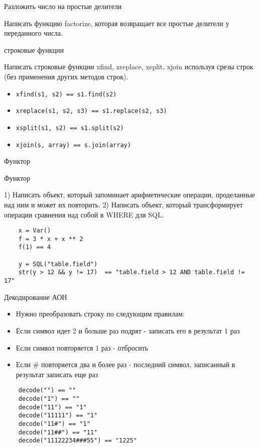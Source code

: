 \documentclass{article}
\begin{document}
\begin{center} Разложить число на простые делители \end{center}
Написать функцию factorize, которая возвращает все простые делители
у переданного числа.
\newpage

\begin{center} строковые функции \end{center}
Написать строковые функции xfind, xreplace, xsplit, xjoin используя
срезы строк (без применения других методов строк).
\begin{itemize}
    \item \lstinline!xfind(s1, s2) == s1.find(s2)!
    \item \lstinline!xreplace(s1, s2, s3) == s1.replace(s2, s3)!
    \item \lstinline!xsplit(s1, s2) == s1.split(s2)!
    \item \lstinline!xjoin(s, array) == s.join(array)!
\end{itemize}
\newpage

\begin{center} Функтор \end{center}

\begin{center} Функтор \end{center}
1) Написать объект, который запоминает арифметические операции, проделанные над ним 
и может их повторить.
2) Написать объект, который трансформирует операции сравнения над собой в WHERE для SQL.

\begin{lstlisting}
    x = Var()
    f = 3 * x + x ** 2
    f(1) == 4

    y = SQL("table.field")
    str(y > 12 && y != 17)  == "table.field > 12 AND table.field != 17"
\end{lstlisting}
\newpage

\begin{center} Декодирование АОН \end{center}
\begin{itemize}
    \item Нужно преобразовать строку по следующим правилам:
    \item Если символ идет 2 и больше раз подрят - записать его в результат 1 раз
    \item Если символ повторяется 1 раз - отбросить
    \item Если \# повторяется два и более раз - последний символ, записанный в результат записать еще раз
\end{itemize}
\begin{lstlisting}
    decode("") == ""
    decode("1") == ""
    decode("11") == "1"
    decode("11111") == "1"
    decode("11#") == "1"
    decode("11##") == "11"
    decode("11122234###55") == "1225"
\end{lstlisting}
\newpage
\end{document}
